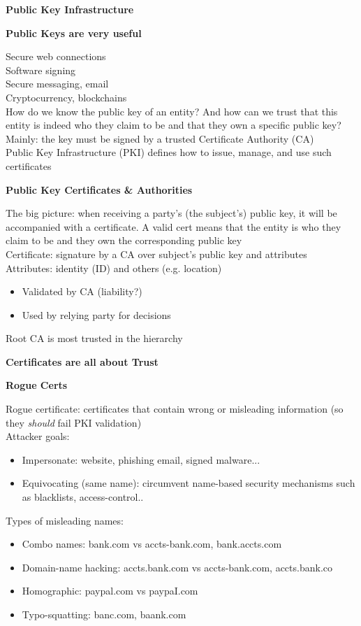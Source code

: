\documentclass{article}
\begin{document}
\textbf{Public Key Infrastructure}

\textbf{Public Keys are very useful}

Secure web connections\\
Software signing\\
Secure messaging, email\\
Cryptocurrency, blockchains\\
How do we know the public key of an entity? And how can we trust that this entity is indeed who they claim to be and that they own a specific public key? Mainly: the key must be signed by a trusted Certificate Authority (CA)\\
Public Key Infrastructure (PKI) defines how to issue, manage, and use such certificates

\textbf{Public Key Certificates \& Authorities}

The big picture: when receiving a party's (the subject's) public key, it will be accompanied with a certificate. A valid cert means that the entity is who they claim to be and they own the corresponding public key\\
Certificate: signature by a CA over subject's public key and attributes\\
Attributes: identity (ID) and others (e.g. location)\begin{itemize}
	\item Validated by CA (liability?)
	\item Used by relying party for decisions
\end{itemize}
Root CA is most trusted in the hierarchy

\textbf{Certificates are all about Trust}

\textbf{Rogue Certs}

Rogue certificate: certificates that contain wrong or misleading information (so they \textit{should} fail PKI validation)\\
Attacker goals:\begin{itemize}
	\item Impersonate: website, phishing email, signed malware...
	\item Equivocating (same name): circumvent name-based security mechanisms such as blacklists, access-control..
\end{itemize}
Types of misleading names:\begin{itemize}
	\item Combo names: bank.com vs accts-bank.com, bank.accts.com
	\item Domain-name hacking: accts.bank.com vs accts-bank.com, accts.bank.co
	\item Homographic: paypal.com vs paypaI.com
	\item Typo-squatting: banc.com, baank.com
\end{itemize}
\end{document}
